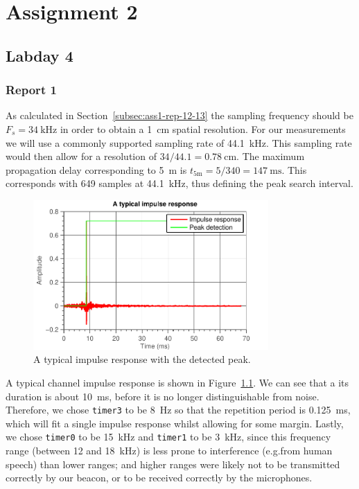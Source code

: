\documentclass[11pt,titlepage]{report}
\begin{document}
\chapter{Assignment 2}
\section{Labday 4}

\subsection{Report 1}
\label{subsec:ass2-report-1}
As calculated in Section~\ref{subsec:ass1-rep-12-13} the sampling frequency should be $F_s=\SI{34}{\kilo\hertz}$ in order to obtain a \SI{1}{\centi\meter} spatial resolution. For our measurements we will use a commonly supported sampling rate of \SI{44.1}{\kilo\hertz}. This sampling rate would then allow for a resolution of $34 / 44.1 = \SI{0.78}{\centi\meter}$. The maximum propagation delay corresponding to \SI{5}{\meter} is $t_{\text{5m}}=5/340=\SI{147}{\milli\second}$. This corresponds with \num{649} samples at \SI{44.1}{\kilo\hertz}, thus defining the peak search interval.

\begin{figure}[H]
	\centering
	\includegraphics[width=0.8\textwidth]{../../deliverable-7-resources/figures/ass-2/report-1/ass-2-report-1.pdf}
	\caption{A typical impulse response with the detected peak.}
	\label{fig:ass-2-rep-1-typical}
\end{figure}

A typical channel impulse response is shown in Figure~\ref{fig:ass-2-rep-1-typical}. We can see that a its duration is about \SI{10}{\milli\second}, before it is no longer distinguishable from noise. Therefore, we chose \texttt{timer3} to be \SI{8}{\hertz} so that the repetition period is \SI{0.125}{\milli\second}, which will fit a single impulse response whilst allowing for some margin. Lastly, we chose \texttt{timer0} to be \SI{15}{kHz} and \texttt{timer1} to be \SI{3}{kHz}, since this frequency range (between \num{12} and \SI{18}{kHz}) is less prone to interference (e.g.from human speech) than lower ranges; and higher ranges were likely not to be transmitted correctly by our beacon, or to be received correctly by the microphones.
\end{document}
